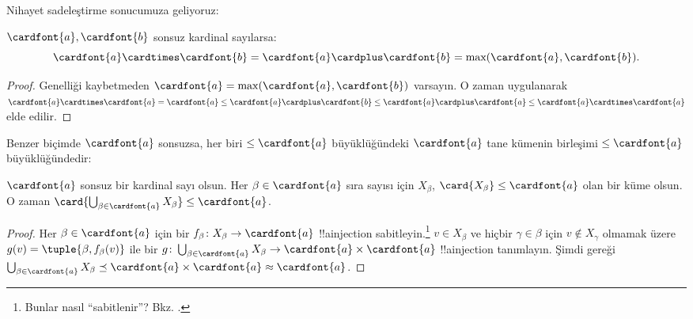 \documentclass[../../../include/open-logic-section]{subfiles}
\begin{document}
Nihayet sadeleştirme sonucumuza geliyoruz:

\begin{thm}
$\cardfont{a},\cardfont{b}$ sonsuz kardinal sayılarsa:
\[
	\cardfont{a}
\cardtimes \cardfont{b} = \cardfont{a} \cardplus \cardfont{b} =
\text{max}(\cardfont{a}, \cardfont{b}).
\]
\end{thm}

\begin{proof}
Genelliği kaybetmeden $\cardfont{a}=\max(\cardfont{a},\cardfont{b})$
varsayın. O zaman  uygulanarak
$\cardfont{a}\cardtimes\cardfont{a}=\cardfont{a}\leq\cardfont{a}
\cardplus\cardfont{b}\leq\cardfont{a}\cardplus\cardfont{a}\leq
\cardfont{a}\cardtimes\cardfont{a}$ elde edilir.
\end{proof}\noindent
Benzer biçimde $\cardfont{a}$ sonsuzsa, her biri
$\leq\cardfont{a}$ büyüklüğündeki $\cardfont{a}$ tane kümenin birleşimi
$\leq\cardfont{a}$ büyüklüğündedir:

\begin{prop}
$\cardfont{a}$ sonsuz bir kardinal sayı olsun. Her
$\beta\in\cardfont{a}$ sıra sayısı için $X_\beta$,
$\card{X_\beta}\leq\cardfont{a}$ olan bir küme olsun. O zaman
$\card{\bigcup_{\beta \in \cardfont{a}} X_\beta}\leq\cardfont{a}$.
\end{prop}

\begin{proof}
Her $\beta\in\cardfont{a}$ için bir $f_\beta\colon
X_\beta\to\cardfont{a}$ !!a{injection} sabitleyin.\footnote{Bunlar nasıl
``sabitlenir''? Bkz. .}
$v\in X_\beta$ ve hiçbir $\gamma\in\beta$ için $v\notin X_\gamma$
olmamak üzere $g(v)=\tuple{\beta,f_\beta(v)}$ ile bir
$g\colon\bigcup_{\beta \in \cardfont{a}}X_\beta\to
\cardfont{a}\times\cardfont{a}$ !!a{injection} tanımlayın. Şimdi
 gereği
$\bigcup_{\beta \in \cardfont{a}} X_\beta \preceq
\cardfont{a}\times\cardfont{a}\approx\cardfont{a}$.
\end{proof}
\end{document}
